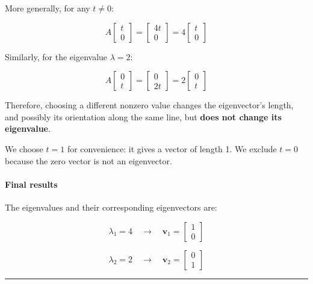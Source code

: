 \documentclass[11pt]{article}
\begin{document}
More generally, for any \(t \neq 0\):

\[
A
\begin{bmatrix}
t \\
0
\end{bmatrix}
=
\begin{bmatrix}
4t \\
0
\end{bmatrix}
=
4
\begin{bmatrix}
t \\
0
\end{bmatrix}
\]

Similarly, for the eigenvalue \(\lambda = 2\):

\[
A
\begin{bmatrix}
0 \\
t
\end{bmatrix}
=
\begin{bmatrix}
0 \\
2t
\end{bmatrix}
=
2
\begin{bmatrix}
0 \\
t
\end{bmatrix}
\]

Therefore, choosing a different nonzero value changes the eigenvector's
length, and possibly its orientation along the same line, but
\textbf{does not change its eigenvalue}.

We choose \(t = 1\) for convenience: it gives a vector of length 1. We
exclude \(t = 0\) because the zero vector is not an eigenvector.

\paragraph{Final results}\label{final-results}

The eigenvalues and their corresponding eigenvectors are:

\[
\boxed{
\lambda_1 = 4
\quad \longrightarrow \quad
\mathbf{v}_1 =
\begin{bmatrix}
1 \\
0
\end{bmatrix}
}
\]

\[
\boxed{
\lambda_2 = 2
\quad \longrightarrow \quad
\mathbf{v}_2 =
\begin{bmatrix}
0 \\
1
\end{bmatrix}
}
\]

\begin{center}\rule{0.5\linewidth}{0.5pt}\end{center}
\end{document}
